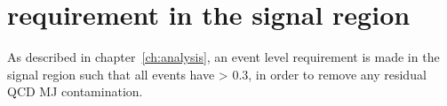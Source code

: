 \chapter{\mindphistar requirement in the signal region}
\label{ch:app_dphistar}

As described in chapter~\ref{ch:analysis}, an event level requirement is made in
the
signal region such that all events have \mindphistar > 0.3, in order to remove
any residual QCD MJ contamination. 




